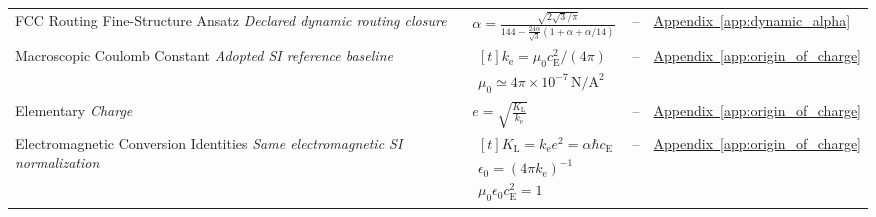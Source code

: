\begin{longtable}{@{} p{4.5cm} p{6cm} c p{4cm} @{}}
{\raggedright FCC Routing Fine-Structure Ansatz \newline \textit{Declared dynamic routing closure}\par} & {\raggedright $\alpha=\frac{\sqrt{2\sqrt3/\pi}}{144-\frac{24\alpha}{\sqrt3}(1+\alpha+\alpha/14)}$\par} & -- & {\raggedright \hyperref[app:dynamic_alpha]{Appendix~\ref*{app:dynamic_alpha}}\par} \\

{\raggedright Macroscopic Coulomb Constant \newline \textit{Adopted SI reference baseline}\par} & {\raggedright $\begin{gathered}[t]k_{\mathrm e}=\mu_0c_{\mathrm E}^2/(4\pi) \\ \mu_0\simeq4\pi\times10^{-7}\,\mathrm{N/A^2}\end{gathered}$\par} & -- & {\raggedright \hyperref[app:origin_of_charge]{Appendix~\ref*{app:origin_of_charge}}\par} \\

{\raggedright Elementary \newline \textit{Charge}\par} & {\raggedright $e = \sqrt{\frac{K_{\mathrm{L}}}{k_{\mathrm{e}}}}$\par} & -- & {\raggedright \hyperref[app:origin_of_charge]{Appendix~\ref*{app:origin_of_charge}}\par} \\

{\raggedright Electromagnetic Conversion Identities \newline \textit{Same electromagnetic SI normalization}\par} & {\raggedright $\begin{gathered}[t]K_{\mathrm L}=k_{\mathrm e}e^2=\alpha\hbar c_{\mathrm E} \\ \epsilon_0=(4\pi k_{\mathrm e})^{-1} \\ \mu_0\epsilon_0c_{\mathrm E}^2=1\end{gathered}$\par} & -- & {\raggedright \hyperref[app:origin_of_charge]{Appendix~\ref*{app:origin_of_charge}}\par} \\


\end{longtable}
